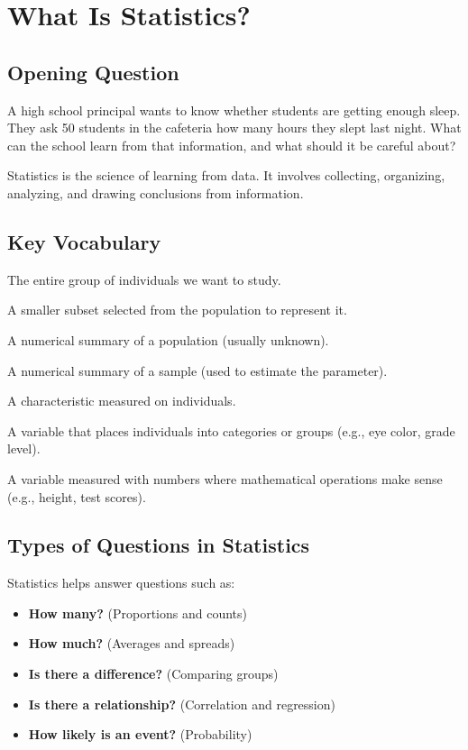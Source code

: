 \documentclass[11pt,openany]{book}
\begin{document}
\mainmatter

\chapter{What Is Statistics?}

\section{Opening Question}
A high school principal wants to know whether students are getting enough sleep. They ask 50 students in the cafeteria how many hours they slept last night. What can the school learn from that information, and what should it be careful about?

\begin{bigidea}
Statistics is the science of learning from data. It involves collecting, organizing, analyzing, and drawing conclusions from information.
\end{bigidea}

\section{Key Vocabulary}
\begin{description}[leftmargin=1.5cm,style=nextline]
    \item[Population] The entire group of individuals we want to study.
    \item[Sample] A smaller subset selected from the population to represent it.
    \item[Parameter] A numerical summary of a population (usually unknown).
    \item[Statistic] A numerical summary of a sample (used to estimate the parameter).
    \item[Variable] A characteristic measured on individuals.
    \item[Categorical variable] A variable that places individuals into categories or groups (e.g., eye color, grade level).
    \item[Quantitative variable] A variable measured with numbers where mathematical operations make sense (e.g., height, test scores).
\end{description}

\section{Types of Questions in Statistics}
Statistics helps answer questions such as:
\begin{itemize}
    \item \textbf{How many?} (Proportions and counts)
    \item \textbf{How much?} (Averages and spreads)
    \item \textbf{Is there a difference?} (Comparing groups)
    \item \textbf{Is there a relationship?} (Correlation and regression)
    \item \textbf{How likely is an event?} (Probability)
\end{itemize}
\end{document}
